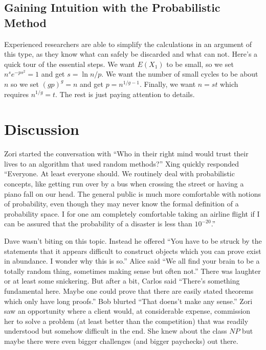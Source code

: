 \subsection{Gaining Intuition with the Probabilistic Method}

Experienced researchers are able to simplify the calculations in
an argument of this type, as they know what can safely be discarded
and what can not.   Here's a quick tour of the essential steps.
We want $E(X_1)$ to be small, so we set $n^se^{-ps^2}=1$ and
get $s=\ln n/p$.  We want the number of small cycles to be about
$n$ so we set $(gp)^g=n$ and get $p=n^{1/g-1}$.  Finally, we want
$n=st$ which requires $n^{1/g}=t$.  The rest is just paying attention
to details.

\section{Discussion}\label{s:ramsey:discussion}

Zori started the conversation with ``Who in their right
mind would trust their lives to an algorithm that used random
methods?''  Xing quickly responded ``Everyone.  At least everyone
should.  We routinely deal with probabilistic concepts, like
getting run over by a bus when crossing the street or having
a piano fall on our head.  The general public is much more
comfortable with notions of probability, even though they
may never know the formal definition of a probability space.
I for one am completely comfortable taking an airline flight
if I can be assured that the probability of a disaster is
less than $10^{-20}$.''

Dave wasn't biting on this topic.  Instead he offered ``You have
to be struck by the statements that it appears difficult to
construct objects which you can prove exist in abundance. I wonder
why this is so.''  Alice said ``We all find your brain to be
a totally random thing, sometimes making sense but often not.''
There was laughter or at least some snickering.  But after a bit,
Carlos said ``There's something fundamental here.  Maybe one
could prove that there are easily stated theorems which
only have long proofs.'' Bob blurted ``That doens't make any
sense.''  Zori saw an opportunity where a client would,
at considerable expense, commission her to solve a problem
(at least better than the competition) that was readily understood 
but somehow difficult in the end.   She knew about the class
$NP$ but maybe there were even bigger challenges (and bigger
paychecks) out there.

